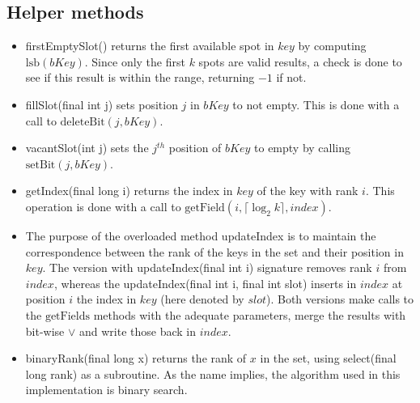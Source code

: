 \subsection{Helper methods} \label{sec:binaryRankHelperMethods}
\begin{itemize}
    \item
    {\ttfamily firstEmptySlot()} returns the first available spot in $key$ by computing $\text{lsb}(bKey)$. Since only the first $k$ spots are valid results, a check is done to see if this result is within the range, returning $-1$ if not.
    
    \item
    {\ttfamily fillSlot(final int j)} sets position $j$ in $bKey$ to not empty. This is done with a call to $\text{deleteBit}(j, bKey)$.
    
    \item
    {\ttfamily vacantSlot(int j)} sets the $j^{th}$ position of $bKey$ to empty by calling $\text{setBit}(j, bKey)$.
    
    \item
    {\ttfamily getIndex(final long i)} returns the index in $key$ of the key with rank $i$. This operation is done with a call to $\text{getField}(i, \lceil \log_2 k\rceil, index)$.
    
    \item
    The purpose of the overloaded method {\ttfamily updateIndex} is to maintain the correspondence between the rank of the keys in the set and their position in $key$.
    The version with {\ttfamily updateIndex(final int i)} signature removes rank $i$ from $index$, whereas the {\ttfamily updateIndex(final int i, final int slot)} inserts in $index$ at position $i$ the index in $key$ (here denoted by $slot$). Both versions make calls to the $\text{getFields}$ methods with the adequate parameters, merge the results with bit-wise $\vee$ and write those back in $index$.
    
    \item
    {\ttfamily binaryRank(final long x)} returns the rank of $x$ in the set, using {\ttfamily select(final long rank)} as a subroutine. As the name implies, the algorithm used in this implementation is binary search.
\end{itemize}

